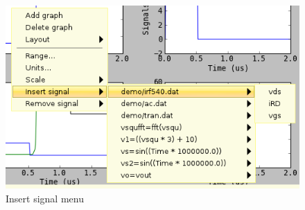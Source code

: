 \documentclass[a4paper,11pt]{article}
\begin{document}
\begin{figure}[htbp]
  \begin{minipage}{0.45\linewidth}
    \includegraphics[scale=.5]{../png/ioscopy-insert.png}
    \caption{Insert signal menu}
    \label{fig:insert}
  \end{minipage}

\end{figure}
\end{document}
